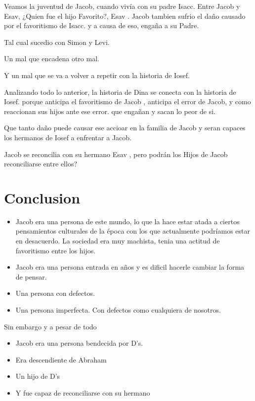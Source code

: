 \documentclass[conference]{IEEEtran}
\begin{document}
Veamos la juventud de Jacob, cuando vivía con su padre Isacc.
Entre Jacob y Esav, ¿Quien fue el hijo Favorito?, Esav .
Jacob tambien sufrio el daño causado por el favoritismo de Isacc.
y a causa de eso, engaña a su Padre. 

Tal cual sucedio con Simon y Levi.

Un mal que encadena otro mal.

Y un mal que se va a volver a repetir con la historia de Iosef.

Analizando todo lo anterior, la historia de Dina se conecta con la historia de Iosef.
porque anticipa el favoritismo de Jacob , anticipa el error de Jacob, y como reaccionan sus hijos ante ese error.
que engañan y sacan lo peor de si.


Que tanto daño puede causar ese accioar en la familia de Jacob y seran capaces los hermanos de Iosef a enfrentar a Jacob.


Jacob se reconcilia con su hermano Esav , pero podrán los Hijos de Jacob reconciliarse entre ellos?




\section{Conclusion}
\begin{itemize}
\item
Jacob era una persona de este mundo, lo que la hace estar atada a ciertos pensamientos 
culturales de la época con los que actualmente podríamos estar en desacuerdo.
La sociedad era muy machista, tenia una actitud de favoritismo entre los hijos.
\item
Jacob era una persona entrada en años y es dificil hacerle cambiar la forma de pensar.
\item
Una persona con defectos.
\item
Una persona imperfecta.
Con defectos como cualquiera de nosotros. 

\end{itemize}

Sin embargo y a pesar de todo
\begin{itemize}
\item
Jacob era una persona bendecida por D's.
\item
Era descendiente de Abraham 
\item
Un hijo de D's
\item
Y fue capaz de reconciliarse con su hermano
\end{itemize}
\end{document}
